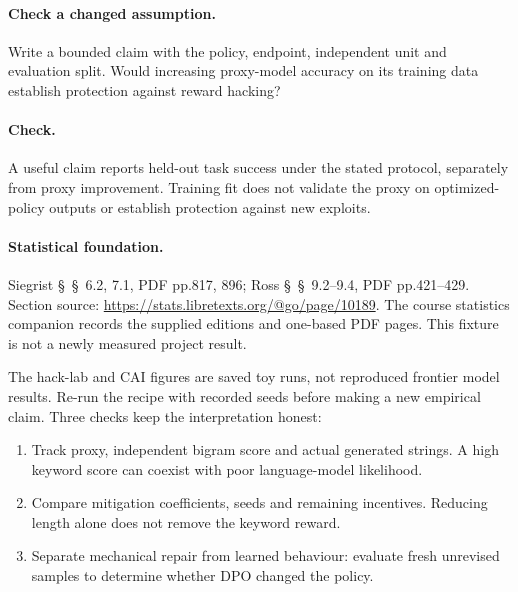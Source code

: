 \documentclass[11pt,oneside]{scrbook}
\begin{document}
\paragraph{Check a changed assumption.} Write a bounded claim with the policy, endpoint, independent unit and evaluation split. Would increasing proxy-model accuracy on its training data establish protection against reward hacking?
\paragraph{Check.} A useful claim reports held-out task success under the stated protocol, separately from proxy improvement. Training fit does not validate the proxy on optimized-policy outputs or establish protection against new exploits.
\paragraph{Statistical foundation.} Siegrist \S~\S~6.2, 7.1, PDF pp.817, 896; Ross \S~\S~9.2--9.4, PDF pp.421--429. Section source: \url{https://stats.libretexts.org/@go/page/10189}. The course statistics companion records the supplied editions and one-based PDF pages. This fixture is not a newly measured project result.



The hack-lab and CAI figures are saved toy runs, not reproduced frontier
model results. Re-run the recipe with recorded seeds before making a new
empirical claim. Three checks keep the interpretation honest:
\begin{enumerate}\setlength{\itemsep}{2pt}
  \item Track proxy, independent bigram score and actual generated strings.
        A high keyword score can coexist with poor language-model likelihood.
  \item Compare mitigation coefficients, seeds and remaining incentives.
        Reducing length alone does not remove the keyword reward.
  \item Separate mechanical repair from learned behaviour: evaluate fresh
        unrevised samples to determine whether DPO changed the policy.
\end{enumerate}
\end{document}
